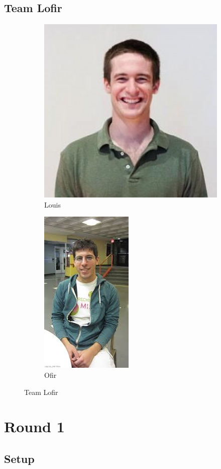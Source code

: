 \documentclass[11pt, oneside]{article} %
\numberwithin{equation}{section} %
\numberwithin{figure}{section} %
\numberwithin{table}{section} %
\begin{document}
	\subsection{Team Lofir}
	
		\begin{figure}
		\centering
		\begin{subfigure}{.4\textwidth}
			\centering
			\includegraphics[width=.4\textwidth]{resources/louis.jpg}
			\caption{Louis}
		\end{subfigure}
		\begin{subfigure}{.4\textwidth}
			\centering
			\includegraphics[width=.4\textwidth]{resources/ofir.jpg}
			\caption{Ofir}
		\end{subfigure}
		\caption{Team Lofir}
	\end{figure}

\section{Round 1}
	\subsection{Setup}
\end{document}
